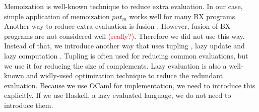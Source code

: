 Memoization \cite{} is well-known technique to reduce extra evaluation. In our case, simple application of memoization $put_m$ works well for many BX programs.
Another way to reduce extra evaluation is fusion \cite{Wadler:1988:DTP:80099.80104}. However, fusion of BX programs are not considered well \textcolor{red}{(really?)}. Therefore we did not use this way.
  Instead of that, we introduce another way that uses tupling \cite{Fokkinga90}, lazy update and lazy computation \cite{}. Tupling is often used for reducing common evaluations, but we use it for reducing the size of complements.
  Lazy evaluation is also a well-known and widly-used optimization technique to reduce the redundant evaluation. Because we use OCaml for implementation, we need to introduce this explicitly. If we use Haskell, a lazy evaluated language, we do not need to introduce them.







